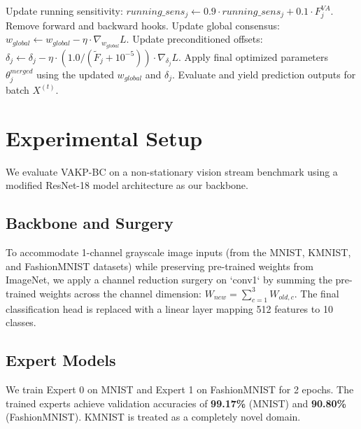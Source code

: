 \documentclass{article}
\theoremstyle{plain}
\theoremstyle{definition}
\theoremstyle{remark}
\begin{document}
\begin{algorithm}[tb]
\begin{algorithmic}[1]
          \STATE Update running sensitivity: $running\_sens_j \leftarrow 0.9 \cdot running\_sens_j + 0.1 \cdot F_j^{VA}$.
        \ENDFOR
        \STATE Remove forward and backward hooks.
        \STATE Update global consensus: $w_{global} \leftarrow w_{global} - \eta \cdot \nabla_{w_{global}} L$.
        \STATE Update preconditioned offsets: $\delta_j \leftarrow \delta_j - \eta \cdot (1.0 / (\tilde{F}_j + 10^{-5})) \cdot \nabla_{\delta_j} L$.
      \ENDFOR
      \STATE Apply final optimized parameters $\theta^{merged}_j$ using the updated $w_{global}$ and $\delta_j$.
      \STATE Evaluate and yield prediction outputs for batch $X^{(t)}$.
    \ENDFOR
  \end{algorithmic}
\end{algorithm}

\section{Experimental Setup}
\label{sec:experiments}

We evaluate VAKP-BC on a non-stationary vision stream benchmark using a modified ResNet-18 model architecture as our backbone. 

\subsection{Backbone and Surgery}
To accommodate 1-channel grayscale image inputs (from the MNIST, KMNIST, and FashionMNIST datasets) while preserving pre-trained weights from ImageNet, we apply a channel reduction surgery on `conv1` by summing the pre-trained weights across the channel dimension: $W_{new} = \sum_{c=1}^3 W_{old,c}$. The final classification head is replaced with a linear layer mapping 512 features to 10 classes.

\subsection{Expert Models}
We train Expert 0 on MNIST and Expert 1 on FashionMNIST for 2 epochs. The trained experts achieve validation accuracies of \textbf{99.17\%} (MNIST) and \textbf{90.80\%} (FashionMNIST). KMNIST is treated as a completely novel domain.
\end{document}
